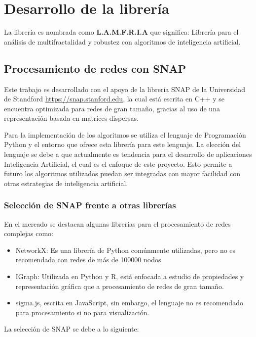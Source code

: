 \section{Desarrollo de la librería}

La librería es nombrada como \textbf{L.A.M.F.R.I.A} que significa: Librería para el análisis de multifractalidad y robustez con algoritmos de inteligencia artificial.

\subsection{Procesamiento de redes con SNAP}

Este trabajo es desarrollado con el apoyo de la librería SNAP de la Universidad de Standford \url{https://snap.stanford.edu}, la cual está escrita en C++ y se encuentra optimizada para redes de gran tamaño, gracias al uso de una representación basada en matrices dispersas.

Para la implementación de los algoritmos se utiliza el lenguaje de Programación Python y el entorno que ofrece esta librería para este lenguaje. La elección del lenguaje se debe a que actualmente es tendencia para el desarrollo de aplicaciones Inteligencia Artificial, el cual es el enfoque de este proyecto. Esto permite a futuro los algoritmos utilizados puedan ser integradas con mayor facilidad con otras estrategias de inteligencia artificial.

\subsubsection{Selección de SNAP frente a otras librerías}

En el mercado se destacan algunas librerías para el procesamiento de redes complejas como:

\begin{itemize}
    \item NetworkX: Es una librería de Python comúnmente utilizadas, pero no es recomendada con redes de más de 100000 nodos
    \item IGraph: Utilizada en Python y R, está enfocada a estudio de propiedades y representación gráfica que a procesamiento de redes de gran tamaño.
    \item sigma.js, escrita en JavaScript, sin embargo, el lenguaje no es recomendado para procesamiento si no para visualización.
\end{itemize}

La selección de SNAP se debe a lo siguiente:

